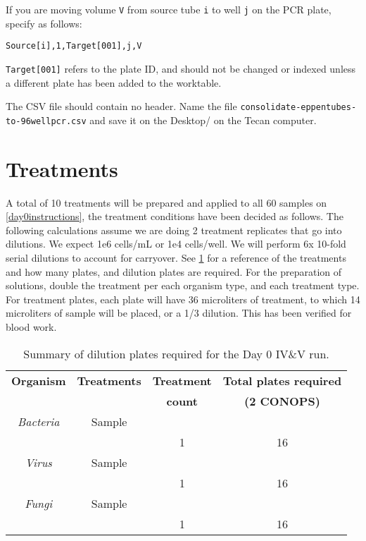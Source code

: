 \documentclass{article}
\begin{document}
If you are moving volume \texttt{V} from source tube \texttt{i} to well \texttt{j} on the PCR plate, specify as follows: 

\texttt{Source[i],1,Target[001],j,V}

\texttt{Target[001]} refers to the plate ID, and should not be changed or indexed unless a different plate has been added to the worktable.

The CSV file should contain no header. Name the file \texttt{consolidate-eppentubes-to-96wellpcr.csv} and save it on the Desktop/ on the Tecan computer. 

\section{Treatments} \label{treatments}
A total of 10 treatments will be prepared and applied to all 60 samples on  \ref{day0instructions}, the treatment conditions have been decided as follows. The following calculations assume we are doing 2 treatment replicates that go into dilutions. We expect 1e6 cells/mL or 1e4 cells/well. We will perform 6x 10-fold serial dilutions to account for carryover. See \ref{tab:dilution-plan-day-0} for a reference of the treatments and how many plates, and dilution plates are required. For the preparation of solutions, double the treatment per each organism type, and each treatment type. For treatment plates, each plate will have 36 microliters of treatment, to which 14 microliters of sample will be placed, or a 1/3 dilution. This has been verified for blood work.

\begin{table} 
  \centering
  \begin{tabular}[]{c|c|c|c}
    \textbf{Organism} & \textbf{Treatments} & \textbf{Treatment} & \textbf{Total plates required} \\
     &  & \textbf{count} & \textbf{(2 CONOPS)} \\
    \hline
    \textit{Bacteria} & Sample  & & \\
    \hline
    & & 1 & 16\\
    \hline
    \textit{Virus} & Sample  & & \\
    \hline
    & & 1 & 16\\
    \hline
    \textit{Fungi} & Sample  & & \\
    \hline
    & & 1 & 16\\
    \hline

  \end{tabular}
  \caption{Summary of dilution plates required for the Day 0 IV\&V run.}
  \label{tab:dilution-plan-day-0}
\end{table}
\end{document}
